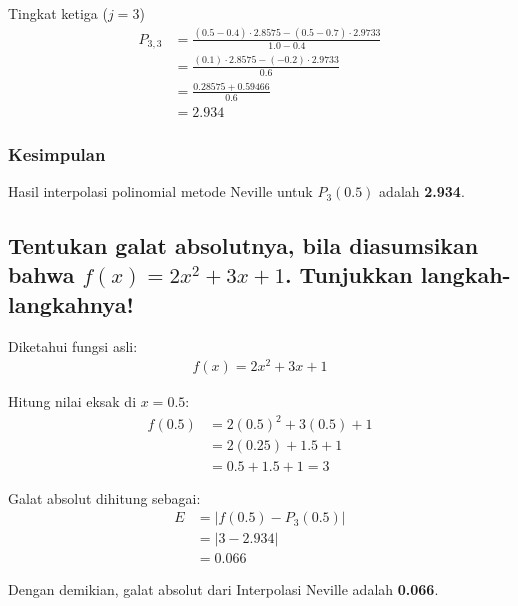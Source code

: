 \documentclass{article}
\begin{document}
Tingkat ketiga ($j = 3$)
\begin{align*}
    P_{3,3} &= \frac{(0.5 - 0.4) \cdot 2.8575 - (0.5 - 0.7) \cdot 2.9733}{1.0 - 0.4} \\
            &= \frac{(0.1) \cdot 2.8575 - (-0.2) \cdot 2.9733}{0.6} \\
            &= \frac{0.28575 + 0.59466}{0.6} \\
            &= 2.934
\end{align*}

\subsubsection{Kesimpulan}
Hasil interpolasi polinomial metode Neville untuk $P_3(0.5)$ adalah \textbf{2.934}.

\subsection{Tentukan galat absolutnya, bila diasumsikan bahwa $f(x) = 2x^2+3x+1$. Tunjukkan langkah-langkahnya!}
Diketahui fungsi asli:
\begin{align*}
    f(x) = 2x^2 + 3x + 1
\end{align*}

Hitung nilai eksak di $x = 0.5$:
\begin{align*}
    f(0.5) &= 2(0.5)^2 + 3(0.5) + 1 \\
           &= 2(0.25) + 1.5 + 1 \\
           &= 0.5 + 1.5 + 1 = 3
\end{align*}

Galat absolut dihitung sebagai:
\begin{align*}
    E &= |f(0.5) - P_3(0.5)| \\
      &= |3 - 2.934| \\
      &= 0.066
\end{align*}

Dengan demikian, galat absolut dari Interpolasi Neville adalah \textbf{0.066}.
\end{document}
